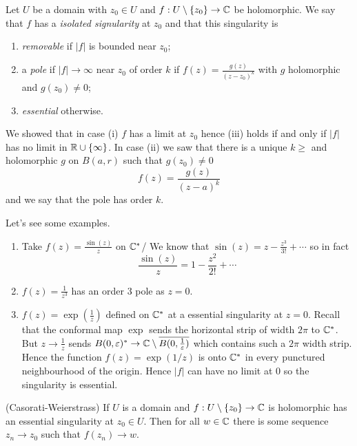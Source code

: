 \documentclass{article}
\begin{document}
\begin{definition}
	Let $ U $ be a domain with $ z_0\in U $ and $ f:U\setminus \{z_0\} \to \mathbb{C} $ be holomorphic. We say that $ f $ has a \textit{isolated signularity} at $ z_0 $ and that this singularity is
	\begin{enumerate}
		\item \textit{removable} if $ |f| $ is bounded near $ z_0 $;
		\item a \textit{pole} if $ |f| \to \infty $ near $ z_0 $ of order $ k $ if $ f(z) = \frac{g(z)}{(z-z_0)^k} $ with $ g $ holomorphic and $ g(z_0)\ne 0 $;
		\item \textit{essential} otherwise.
	\end{enumerate}
\end{definition}
We showed that in case (i) $ f $ has a limit at $ z_0 $ hence (iii) holds if and only if $ |f| $ has no limit in $ \mathbb{R}\cup \{\infty\} $. In case (ii) we saw that there is a unique $ k\ge $ and holomorphic $ g $ on $ B(a,r) $ such that $ g(z_0)\ne 0 $
\[
	f(z) = \frac{g(z)}{(z-a)^k}
\]
and we say that the pole has order $ k $.
\begin{example}
  Let's see some examples.
  \begin{enumerate}
	  \item Take $ f(z)=\frac{\sin(z)}z $ on $ \mathbb{C}^* $/ We know that $ \sin(z) = z - \frac{z^3}{3!} +\cdots $ so in fact 
		  \[
			  \frac{\sin(z)}z = 1 - \frac{z^2}{2!} + \cdots
		  \]
	  \item $ f(z) = \frac 1{z^3} $ has an order $ 3 $ pole as $ z=0 $.
	  \item $ f(z) = \exp\left(\frac 1z\right) $ defined on $ \mathbb{C}^* $ at a essential singularity at $ z=0 $. Recall that the conformal map $ \exp $ sends the horizontal strip of width $ 2\pi $ to $ \mathbb{C}^* $. But $ z\to \frac 1z $ sends $ B(0,\varepsilon)^*\to \mathbb{C}\setminus \overline{B(0,\frac 1{\varepsilon})} $ which contains such a $ 2\pi $ width strip. Hence the function $ f(z) = \exp(1/z) $ is onto $ \mathbb{C}^* $ in every punctured neighbourhood of the origin. Hence $ |f| $ can have no limit at $ 0 $ so the singularity is essential.
  \end{enumerate}
\end{example}
\begin{theorem}
	(Casorati-Weierstrass) If $ U $ is a domain and $ f: U\setminus \{z_0\} \to \mathbb{C} $ is holomorphic has an essential singularity at $ z_0\in U $. Then for all $ w\in \mathbb{C} $ there is some sequence $ z_n\to z_0 $ such that $ f(z_n)\to w $.
\end{theorem} 
\end{document}
